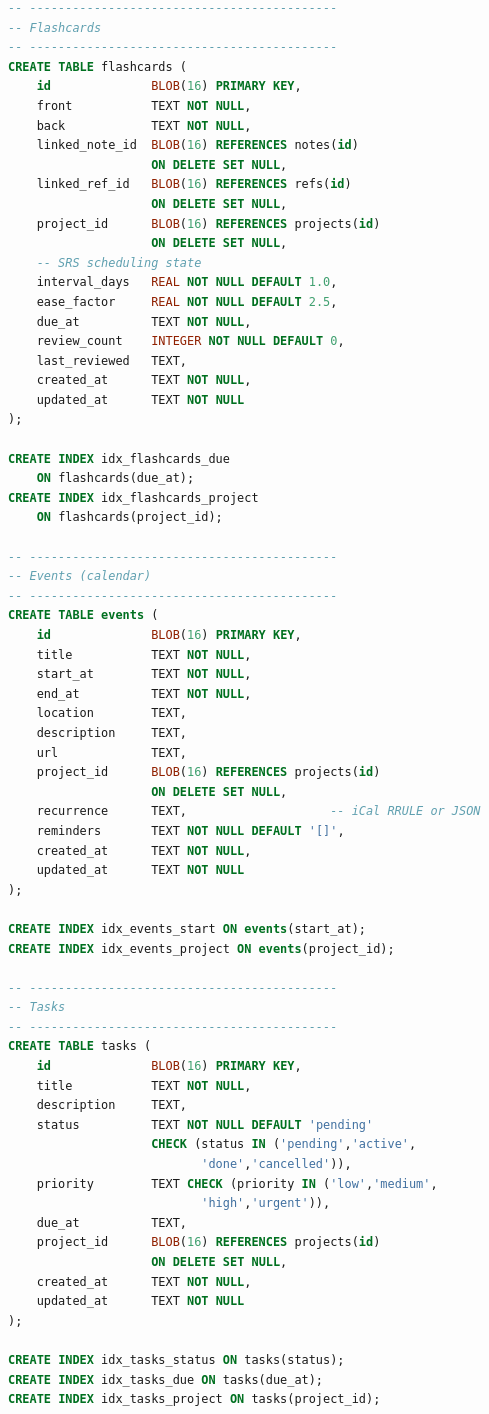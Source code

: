 \documentclass[11pt,a4paper]{article}
\begin{document}
\begin{lstlisting}[language=SQL, basicstyle=\ttfamily\footnotesize]
-- -------------------------------------------
-- Flashcards
-- -------------------------------------------
CREATE TABLE flashcards (
    id              BLOB(16) PRIMARY KEY,
    front           TEXT NOT NULL,
    back            TEXT NOT NULL,
    linked_note_id  BLOB(16) REFERENCES notes(id)
                    ON DELETE SET NULL,
    linked_ref_id   BLOB(16) REFERENCES refs(id)
                    ON DELETE SET NULL,
    project_id      BLOB(16) REFERENCES projects(id)
                    ON DELETE SET NULL,
    -- SRS scheduling state
    interval_days   REAL NOT NULL DEFAULT 1.0,
    ease_factor     REAL NOT NULL DEFAULT 2.5,
    due_at          TEXT NOT NULL,
    review_count    INTEGER NOT NULL DEFAULT 0,
    last_reviewed   TEXT,
    created_at      TEXT NOT NULL,
    updated_at      TEXT NOT NULL
);

CREATE INDEX idx_flashcards_due
    ON flashcards(due_at);
CREATE INDEX idx_flashcards_project
    ON flashcards(project_id);

-- -------------------------------------------
-- Events (calendar)
-- -------------------------------------------
CREATE TABLE events (
    id              BLOB(16) PRIMARY KEY,
    title           TEXT NOT NULL,
    start_at        TEXT NOT NULL,
    end_at          TEXT NOT NULL,
    location        TEXT,
    description     TEXT,
    url             TEXT,
    project_id      BLOB(16) REFERENCES projects(id)
                    ON DELETE SET NULL,
    recurrence      TEXT,                    -- iCal RRULE or JSON
    reminders       TEXT NOT NULL DEFAULT '[]',
    created_at      TEXT NOT NULL,
    updated_at      TEXT NOT NULL
);

CREATE INDEX idx_events_start ON events(start_at);
CREATE INDEX idx_events_project ON events(project_id);

-- -------------------------------------------
-- Tasks
-- -------------------------------------------
CREATE TABLE tasks (
    id              BLOB(16) PRIMARY KEY,
    title           TEXT NOT NULL,
    description     TEXT,
    status          TEXT NOT NULL DEFAULT 'pending'
                    CHECK (status IN ('pending','active',
                           'done','cancelled')),
    priority        TEXT CHECK (priority IN ('low','medium',
                           'high','urgent')),
    due_at          TEXT,
    project_id      BLOB(16) REFERENCES projects(id)
                    ON DELETE SET NULL,
    created_at      TEXT NOT NULL,
    updated_at      TEXT NOT NULL
);

CREATE INDEX idx_tasks_status ON tasks(status);
CREATE INDEX idx_tasks_due ON tasks(due_at);
CREATE INDEX idx_tasks_project ON tasks(project_id);


\end{lstlisting}
\end{document}
